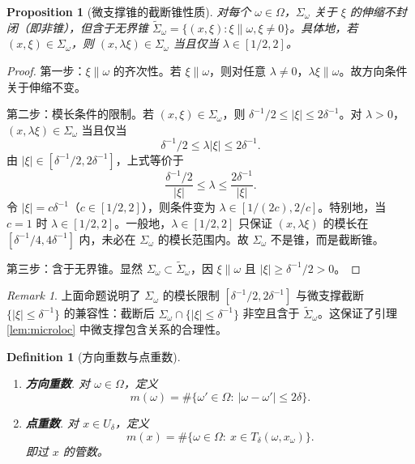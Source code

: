 \documentclass[11pt,a4paper]{article}
\newtheorem{proposition}[theorem]{Proposition}
\newtheorem{definition}[theorem]{Definition}
\theoremstyle{remark}
\newtheorem{remark}[theorem]{Remark}
\begin{document}
	\begin{proposition}[微支撑锥的截断锥性质]
		对每个 $\omega\in\Omega$，$\Sigma_\omega$ 关于 $\xi$ 的伸缩不封闭（即非锥），但含于无界锥 $\widetilde\Sigma_\omega=\{(x,\xi):\xi\parallel\omega,\xi\neq0\}$。具体地，若 $(x,\xi)\in\Sigma_\omega$，则 $(x,\lambda\xi)\in\Sigma_\omega$ 当且仅当 $\lambda\in[1/2,2]$。
	\end{proposition}
	
	\begin{proof}
		第一步：$\xi\parallel\omega$ 的齐次性。若 $\xi\parallel\omega$，则对任意 $\lambda\neq0$，$\lambda\xi\parallel\omega$。故方向条件关于伸缩不变。
		
		第二步：模长条件的限制。若 $(x,\xi)\in\Sigma_\omega$，则 $\delta^{-1}/2\le|\xi|\le2\delta^{-1}$。对 $\lambda>0$，$(x,\lambda\xi)\in\Sigma_\omega$ 当且仅当
		\[
		\delta^{-1}/2\le\lambda|\xi|\le2\delta^{-1}.
		\]
		由 $|\xi|\in[\delta^{-1}/2,2\delta^{-1}]$，上式等价于
		\[
		\frac{\delta^{-1}/2}{|\xi|}\le\lambda\le\frac{2\delta^{-1}}{|\xi|}.
		\]
		令 $|\xi|=c\delta^{-1}$（$c\in[1/2,2]$），则条件变为 $\lambda\in[1/(2c),2/c]$。特别地，当 $c=1$ 时 $\lambda\in[1/2,2]$。一般地，$\lambda\in[1/2,2]$ 只保证 $(x,\lambda\xi)$ 的模长在 $[\delta^{-1}/4,4\delta^{-1}]$ 内，未必在 $\Sigma_\omega$ 的模长范围内。故 $\Sigma_\omega$ 不是锥，而是截断锥。
		
		第三步：含于无界锥。显然 $\Sigma_\omega\subset\widetilde\Sigma_\omega$，因 $\xi\parallel\omega$ 且 $|\xi|\ge\delta^{-1}/2>0$。
	\end{proof}
	
	\begin{remark}
		上面命题说明了 $\Sigma_\omega$ 的模长限制 $[\delta^{-1}/2,2\delta^{-1}]$ 与微支撑截断 $\{|\xi|\le\delta^{-1}\}$ 的兼容性：截断后 $\Sigma_\omega\cap\{|\xi|\le\delta^{-1}\}$ 非空且含于 $\widetilde\Sigma_\omega$。这保证了引理 \ref{lem:microloc} 中微支撑包含关系的合理性。
	\end{remark}
	
	\begin{definition}[方向重数与点重数]
		\begin{enumerate}
			\item[(a)] \textbf{方向重数}. 对 $\omega\in\Omega$，定义
			\[
			m(\omega)=\#\{\omega'\in\Omega:\ |\omega-\omega'|\le2\delta\}.
			\]
			\item[(b)] \textbf{点重数}. 对 $x\in U_\delta$，定义
			\[
			m(x)=\#\{\omega\in\Omega:\ x\in T_\delta(\omega,x_\omega)\}.
			\]
			即过 $x$ 的管数。
		\end{enumerate}
	\end{definition}
	
\end{document}
